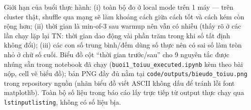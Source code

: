 \documentclass[12pt,a4paper,oneside]{article}
\begin{document}
Giới hạn của buổi thực hành: (i) toàn bộ đo ở local mode trên 1 máy --- trên cluster thật, shuffle qua mạng sẽ làm khoảng cách giữa cách tốt và cách kém còn rộng hơn; (ii) thời gian là min-of-3 sau warmup nên vẫn có nhiễu (thấy rõ ở các lần chạy lặp lại TN: thời gian dao động vài phần trăm trong khi số tất định không đổi); (iii) các con số trung bình/đếm dùng số thực nên có sai số làm tròn nhỏ ở chữ số cuối. Biểu đồ cột ``thời gian trước/sau'' cho 9 nguyên tắc được nhúng sẵn trong notebook đã chạy (\texttt{buoi1\_toiuu\_executed.ipynb} kèm theo bài nộp, cell vẽ biểu đồ); bản PNG đầy đủ nằm tại \texttt{code/outputs/bieudo\_toiuu.png} trong repository nguồn (nhãn biểu đồ viết ASCII không dấu để tránh lỗi font matplotlib). Toàn bộ số liệu trong báo cáo lấy trực tiếp từ output thực chạy qua \texttt{lstinputlisting}, không có số liệu bịa.
\end{document}
